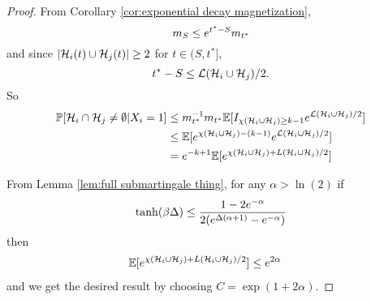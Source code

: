 \begin{proof}
		From Corollary \ref{cor:exponential decay magnetization}, 
		\begin{equation}
			m_S \leq e^{t^* - S} m_{t^*}
		\end{equation}
		and since $|\mathcal{H}_i(t) \cup \mathcal{H}_j(t)| \geq 2$ for $t \in (S, t^*]$,
		\begin{equation}
			t^* - S \leq \mathcal{L}(\mathcal{H}_i \cup \mathcal{H}_j)/2.
		\end{equation}
		So
		\begin{align}
			\prob[\mathcal{H}_i \cap \mathcal{H}_j \neq \emptyset | X_i = 1] %
			&\leq m_{t^*}^{-1} m_{t^*} \expect[\indicator_{\chi(\hist_i \cup \hist_j) \geq k-1} \euler^{\mathcal{L}(\hist_i\cup \hist_j)/2}]\\
			&\leq \expect[\euler^{\chi(\hist_i\cup \hist_j) - (k-1)} \euler^{\mathcal{L}(\hist_i\cup \hist_j)/2}]\\
			&= \euler^{-k + 1} \expect[\euler^{\chi(\hist_i\cup \hist_j) + L(\hist_i\cup \hist_j)/2} ]
		\end{align}

		From Lemma \ref{lem:full submartingale thing}, for any $\alpha > \ln(2)$ if
		\begin{equation}
			\tanh(\beta\Delta) \leq \frac{1-2e^{-\alpha}}{2(e^{\Delta(\alpha+1)} - e^{-\alpha})}
		\end{equation}
		then
		\begin{align}
			\mathbb{E}[e^{\chi(\mathcal{H}_i\cup \mathcal{H}_j) + L(\mathcal{H}_i\cup \mathcal{H}_j)/2} ] &\leq e^{2\alpha}
		\end{align}
		and we get the desired result by choosing $C = \exp(1 + 2\alpha)$.
	\end{proof}